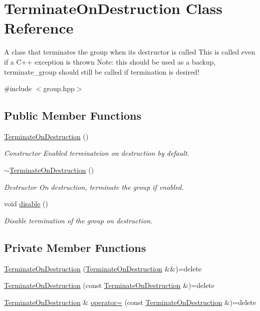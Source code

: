 \hypertarget{class_terminate_on_destruction}{}\section{Terminate\+On\+Destruction Class Reference}
\label{class_terminate_on_destruction}


A class that terminates the group when its destructor is called This is called even if a C++ exception is thrown Note\+: this should be used as a backup, terminate\+\_\+group should still be called if termination is desired!  




{\ttfamily \#include $<$group.\+hpp$>$}

\subsection*{Public Member Functions}
\begin{DoxyCompactItemize}
\item 
\hyperlink{class_terminate_on_destruction_ac1b230c0858db2e39b83188eae7c5a8e}{Terminate\+On\+Destruction} ()
\begin{DoxyCompactList}\small\item\em Constructor Enabled terminateion on destruction by default. \end{DoxyCompactList}\item 
\hyperlink{class_terminate_on_destruction_a1e2e372004731b788bb9df84d618181f}{$\sim$\+Terminate\+On\+Destruction} ()
\begin{DoxyCompactList}\small\item\em Destructor On destruction, terminate the group if enabled. \end{DoxyCompactList}\item 
void \hyperlink{class_terminate_on_destruction_a3ee7e31e435328d6ff97edd5627f7c27}{disable} ()
\begin{DoxyCompactList}\small\item\em Disable termination of the group on destruction. \end{DoxyCompactList}\end{DoxyCompactItemize}
\subsection*{Private Member Functions}
\begin{DoxyCompactItemize}
\item 
\hyperlink{class_terminate_on_destruction_afbcf618507814357fc16fcf49ac27316}{Terminate\+On\+Destruction} (\hyperlink{class_terminate_on_destruction}{Terminate\+On\+Destruction} \&\&)=delete
\item 
\hyperlink{class_terminate_on_destruction_aaf44815fef9e402548f3fe950bc23a82}{Terminate\+On\+Destruction} (const \hyperlink{class_terminate_on_destruction}{Terminate\+On\+Destruction} \&)=delete
\item 
\hyperlink{class_terminate_on_destruction}{Terminate\+On\+Destruction} \& \hyperlink{class_terminate_on_destruction_aef7320686e582846fd4e30c142feec18}{operator=} (const \hyperlink{class_terminate_on_destruction}{Terminate\+On\+Destruction} \&)=delete
\end{DoxyCompactItemize}
